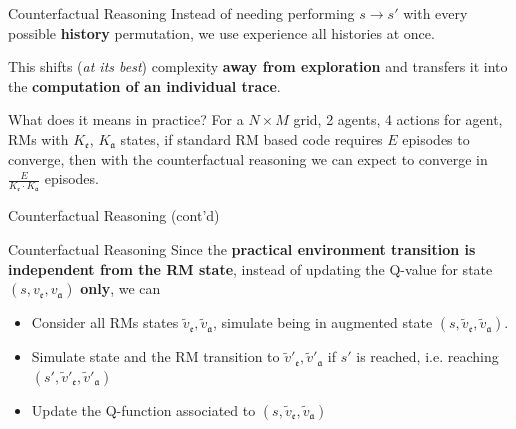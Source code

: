 \documentclass[10pt, aspectratio=169]{beamer}
\newcommand{\evidenzia}[1]{\textcolor{verdeSalvia}{\textbf{#1}}}
\begin{document}
\begin{frame}{Counterfactual Reasoning}
    Instead of needing performing $s\rightarrow s'$ with every possible \evidenzia{history} permutation, we use experience all histories at once.
    \vspace{0.5cm}

    This shifts (\textit{at its best}) complexity \evidenzia{away from exploration} and transfers it into the \evidenzia{computation of an individual trace}.
    
    \vspace{0.5cm}
    \begin{block}{What does it means in practice?}
    For a $N\times M$ grid, 2 agents, 4 actions for agent, RMs with $K_\mathfrak{e}$, $K_\mathfrak{a}$ states, if standard RM based code requires $E$ episodes to converge, then with the counterfactual reasoning we can expect to converge in $\frac{E}{K_\mathfrak{e} \cdot K_\mathfrak{a}}$ episodes.
    \end{block}
\end{frame}

\begin{frame}{Counterfactual Reasoning (cont'd)}

    

    \vspace{0.2cm}
    \begin{block}{Counterfactual Reasoning}
    Since the \evidenzia{practical environment transition is independent from the RM state}, instead of updating the Q-value for state $(s, v_{\mathfrak{e}}, v_{\mathfrak{a}})$ \evidenzia{only}, we can
    \begin{itemize}
        \item Consider all RMs states $\tilde v_{\mathfrak{e}},\tilde v_{\mathfrak{a}}$, simulate being in augmented state $(s, \tilde v_{\mathfrak{e}},\tilde v_{\mathfrak{a}})$.
        \item Simulate state and the RM transition to $\tilde v'_{\mathfrak{e}},\tilde v'_{\mathfrak{a}}$ if $s'$ is reached, i.e. reaching $(s', \tilde v'_{\mathfrak{e}},\tilde v'_{\mathfrak{a}})$
        \item Update  the Q-function associated to $(s, \tilde v_{\mathfrak{e}},\tilde v_{\mathfrak{a}})$
    \end{itemize} 
    \end{block}

\end{frame}
\end{document}
